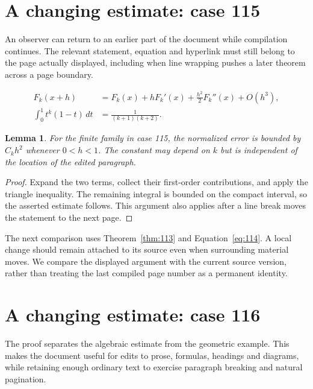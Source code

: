 \documentclass[a4paper,10pt]{article}
\newtheorem{lemma}[theorem]{Lemma}
\begin{document}
\lipsum[18]

\section{A changing estimate: case 115}\label{unit:114}
An observer can return to an earlier part of the document while compilation continues. The relevant statement, equation and hyperlink must still belong to the page actually displayed, including when line wrapping pushes a later theorem across a page boundary.

\lipsum[13-14]
\begin{align}\label{eq:114}
 F_k(x+h)&=F_k(x)+hF_k'(x)+\frac{h^2}{2}F_k''(x)+O(h^3),\\
 \int_0^1 t^k(1-t)\,dt&=\frac{1}{(k+1)(k+2)}.
\end{align}
\begin{lemma}\label{thm:114}
For the finite family in case 115, the normalized error is bounded by $C_k h^2$ whenever $0<h<1$. The constant may depend on $k$ but is independent of the location of the edited paragraph.
\end{lemma}
\begin{proof}
Expand the two terms, collect their first-order contributions, and apply the
triangle inequality. The remaining integral is bounded on the compact interval,
so the asserted estimate follows. This argument also applies after a line break
moves the statement to the next page.
\end{proof}
The next comparison uses Theorem~\ref{thm:113} and Equation~\ref{eq:114}. A local change should remain attached to its source even when surrounding material moves. We compare the displayed argument with the current source version, rather than treating the last compiled page number as a permanent identity.

\lipsum[23]

\section{A changing estimate: case 116}\label{unit:115}
The proof separates the algebraic estimate from the geometric example. This makes the document useful for edits to prose, formulas, headings and diagrams, while retaining enough ordinary text to exercise paragraph breaking and natural pagination.
\end{document}
